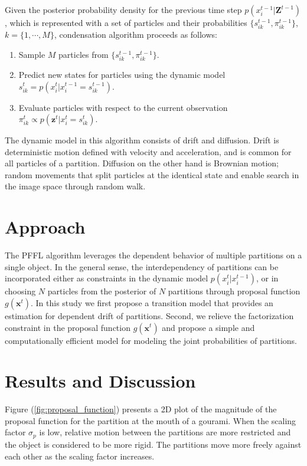 \documentclass[a4paper, 12pt, oneside]{Thesis}  %
\begin{document}
Given the posterior probability density for the previous time step $p(x_i^{t-1}|\mathbf{Z}^{t-1})$, which is represented with a set of particles and their probabilities $\{s_{ik}^{t-1},\pi_{ik}^{t-1}\}$, $k=\{1,\cdots,M\}$, condensation algorithm proceeds as follows:

\begin{enumerate}
\item Sample $M$ particles from $\{s_{ik}^{t-1},\pi_{ik}^{t-1}\}$.
\item Predict new states for particles using the dynamic model $s_{ik}^t=p(x_i^t|x_i^{t-1}=s_{ik}^{t-1})$.
\item Evaluate particles with respect to the current observation $\pi_{ik}^t\propto p(\mathbf{z}^t|x_i^t=s_{ik}^t)$.
\end{enumerate}

The dynamic model in this algorithm consists of drift and diffusion. Drift is deterministic motion defined with velocity and acceleration, and is common for all particles of a partition. Diffusion on the other hand is Brownian motion; random movements that split particles at the identical state and enable search in the image space through random walk. 

\chapter{Approach} 
\label{ch:approach}
The PFFL algorithm leverages the dependent behavior of multiple partitions on a single object. In the general sense, the interdependency of partitions can be incorporated either as constraints in the dynamic model $p(x_i^t|x_i^{t-1})$, or in choosing $N$ particles from the posterior of $N$ partitions through proposal function $g(\mathbf{x}^t)$. In this study we first propose a transition model that provides an estimation for dependent drift of partitions. Second, we relieve the factorization constraint in the proposal function $g(\mathbf{x}^t)$ and propose a simple and computationally efficient model for modeling the joint probabilities of partitions.

\chapter{Results and Discussion} 
\label{ch:results}
Figure (\ref{fig:proposal_function}) presents a 2D plot of the magnitude of the proposal function for the partition at the mouth of a gourami. When the scaling factor $\sigma_p$ is low, relative motion between the partitions are more restricted and the object is considered to be more rigid. The partitions move more freely against each other as the scaling factor increases. 
\end{document}
